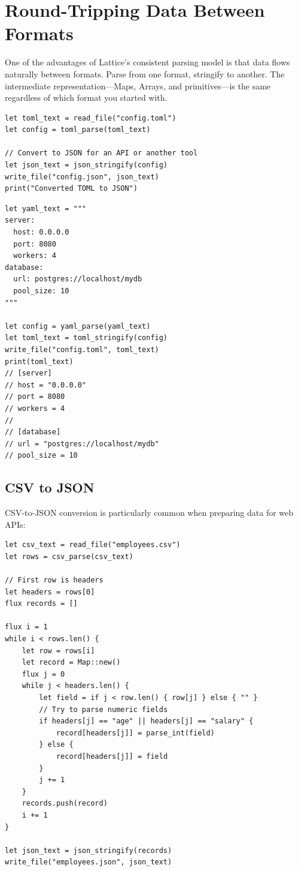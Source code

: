 \section{Round-Tripping Data Between Formats}\label{sec:round-tripping}


One of the advantages of Lattice's consistent parsing model is that data
flows naturally between formats. Parse from one format, stringify to another.
The intermediate representation---Maps, Arrays, and primitives---is the same
regardless of which format you started with.

\begin{lstlisting}[language=Lattice, caption={Converting TOML configuration to JSON}]
let toml_text = read_file("config.toml")
let config = toml_parse(toml_text)

// Convert to JSON for an API or another tool
let json_text = json_stringify(config)
write_file("config.json", json_text)
print("Converted TOML to JSON")
\end{lstlisting}

\begin{lstlisting}[language=Lattice, caption={Converting YAML to TOML}]
let yaml_text = """
server:
  host: 0.0.0.0
  port: 8080
  workers: 4
database:
  url: postgres://localhost/mydb
  pool_size: 10
"""

let config = yaml_parse(yaml_text)
let toml_text = toml_stringify(config)
write_file("config.toml", toml_text)
print(toml_text)
// [server]
// host = "0.0.0.0"
// port = 8080
// workers = 4
//
// [database]
// url = "postgres://localhost/mydb"
// pool_size = 10
\end{lstlisting}

\subsection{CSV to JSON}

CSV-to-JSON conversion is particularly common when preparing data for web
APIs:

\begin{lstlisting}[language=Lattice, caption={Converting CSV to JSON}]
let csv_text = read_file("employees.csv")
let rows = csv_parse(csv_text)

// First row is headers
let headers = rows[0]
flux records = []

flux i = 1
while i < rows.len() {
    let row = rows[i]
    let record = Map::new()
    flux j = 0
    while j < headers.len() {
        let field = if j < row.len() { row[j] } else { "" }
        // Try to parse numeric fields
        if headers[j] == "age" || headers[j] == "salary" {
            record[headers[j]] = parse_int(field)
        } else {
            record[headers[j]] = field
        }
        j += 1
    }
    records.push(record)
    i += 1
}

let json_text = json_stringify(records)
write_file("employees.json", json_text)
\end{lstlisting}

